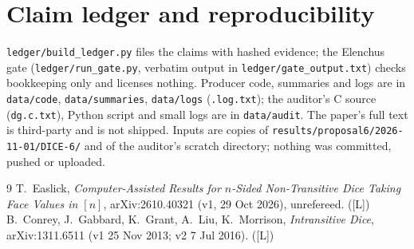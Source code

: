 \documentclass[10pt]{article}
\newcommand{\tier}[1]{\textsf{[#1]}}
\newcommand{\tL}{\tier{L}}
\begin{document}
\section{Claim ledger and reproducibility}\label{sec:ledger}
\texttt{ledger/build\_ledger.py} files the claims with hashed evidence; the Elenchus gate (\texttt{ledger/run\_gate.py}, verbatim output in \texttt{ledger/gate\_output.txt}) checks bookkeeping only and licenses nothing. Producer code, summaries and logs are in \texttt{data/code}, \texttt{data/summaries}, \texttt{data/logs} (\texttt{.log.txt}); the auditor's C source (\texttt{dg.c.txt}), Python script and small logs are in \texttt{data/audit}. The paper's full text is third-party and is not shipped. Inputs are copies of \texttt{results/proposal6/2026-11-01/DICE-6/} and of the auditor's scratch directory; nothing was committed, pushed or uploaded.

\begin{thebibliography}{9}\small
{} T.\ Easlick, \emph{Computer-Assisted Results for $n$-Sided Non-Transitive Dice Taking Face Values in $[n]$}, arXiv:2610.40321 (v1, 29 Oct 2026), unrefereed. (\tL)
 B.\ Conrey, J.\ Gabbard, K.\ Grant, A.\ Liu, K.\ Morrison, \emph{Intransitive Dice}, arXiv:1311.6511 (v1 25 Nov 2013; v2 7 Jul 2016). (\tL)
\end{thebibliography}
\end{document}
